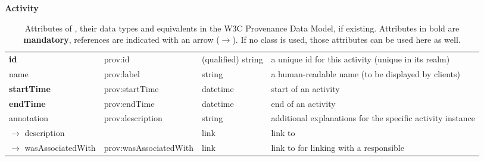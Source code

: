 \begin{table}[h]

\small
{}\textwidth

\textbf{\normalsize Activity}\vspace{0.25em}\\
\begin{tabulary}{1.0\textwidth}{@{}lp{3.5cm}p{2cm}L@{}}
\toprule
{} &  &  & \\
\midrule
\textbf{id} & prov:id  & (qualified) string & a unique id for this activity (unique in its realm)\\
name        & prov:label  & string & a human-readable name (to be displayed by clients)\\
\textbf{startTime} & prov:startTime & datetime & start of an activity\\
\textbf{endTime} & prov:endTime  & datetime & end of an activity\\
annotation        & prov:description & string & additional explanations for the specific activity instance\\
\midrule
$\rightarrow$ description &  & link & link to \\
$\rightarrow$ wasAssociatedWith & prov:wasAssociatedWith  & link & link to  for linking with a responsible \\
\bottomrule
\end{tabulary}
\caption[Attributes of .]{Attributes of , their data types and equivalents in the W3C Provenance 
Data Model, if existing. Attributes in bold are \textbf{mandatory}, references are indicated with an arrow ($\rightarrow$). If no  class is used, those attributes can be used here as well.}
\end{table}


